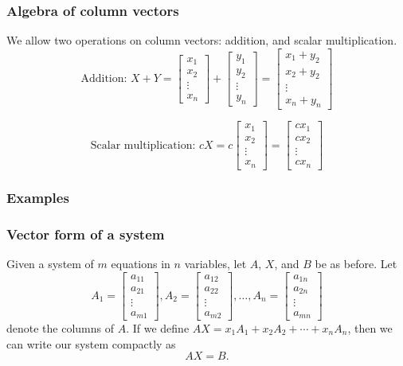 \documentclass[12pt,t]{beamer}
\begin{document}
\begin{frame}\frametitle{Algebra of column vectors}
We allow two operations on column vectors: \alert{addition}, and \alert{scalar multiplication}. 
\[
\text{Addition: } X+Y = 
\begin{bmatrix}
x_1\\x_2\\ \vdots \\ x_n
\end{bmatrix}
+\begin{bmatrix}
y_1\\y_2\\ \vdots\\y_n
\end{bmatrix}
=\begin{bmatrix}
x_1+y_2\\x_2+y_2\\ \vdots\\x_n+y_n
\end{bmatrix}
\]

\[
\text{Scalar multiplication: } cX = 
c\begin{bmatrix}
x_1\\x_2\\  \vdots\\x_n
\end{bmatrix}
=\begin{bmatrix}
cx_1\\cx_2\\ \vdots \\cx_n
\end{bmatrix}
\]
\end{frame}
\begin{frame}\frametitle{Examples}

\end{frame}
\begin{frame}\frametitle{Vector form of a system}
Given a system of $m$ equations in $n$ variables, let $A$, $X$, and $B$ be as before. Let
\[
A_1 = \begin{bmatrix}
a_{11}\\a_{21}\\\vdots \\a_{m1}
\end{bmatrix}, A_2 = \begin{bmatrix}
a_{12}\\a_{22}\\\vdots\\a_{m2}
\end{bmatrix}, \ldots, A_n = \begin{bmatrix}
a_{1n}\\a_{2n}\\\vdots \\a_{mn}
\end{bmatrix}
\]
denote the columns of $A$. If we define $AX = x_1A_1+x_2A_2+\cdots +x_nA_n$, then we can write our system compactly as
\[
AX=B.
\]
\end{frame}
\end{document}
